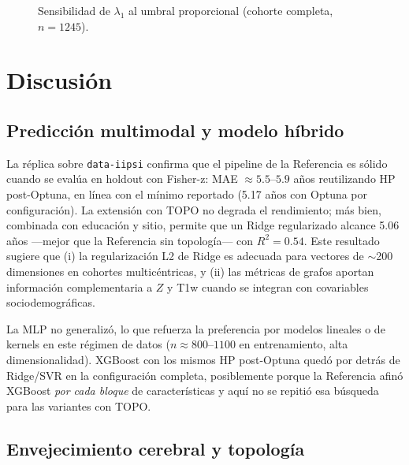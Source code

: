 \documentclass[12pt,a4paper]{article}
\begin{document}
\begin{figure}[H]
  \centering
  \caption{Sensibilidad de $\lambda_1$ al umbral proporcional (cohorte completa, $n = 1245$).}
  \label{fig:sensitivity}
\end{figure}

\section{Discusión}

\subsection{Predicción multimodal y modelo híbrido}

La réplica sobre \texttt{data-iipsi} confirma que el pipeline de la Referencia es sólido cuando
se evalúa en holdout con Fisher-z: MAE $\approx 5.5$--$5.9$ años reutilizando HP post-Optuna,
en línea con el mínimo reportado (5.17 años con Optuna por configuración). La extensión con TOPO no degrada el rendimiento;
más bien, combinada con educación y sitio, permite que un Ridge regularizado alcance
5.06 años ---mejor que la Referencia sin topología--- con $R^2 = 0.54$. Este resultado
sugiere que (i) la regularización L2 de Ridge es adecuada para vectores de $\sim$200 dimensiones
en cohortes multicéntricas, y (ii) las métricas de grafos aportan información complementaria a
$Z$ y T1w cuando se integran con covariables sociodemográficas.

La MLP no generalizó, lo que refuerza la preferencia por modelos lineales o de kernels en este
régimen de datos ($n \approx 800$--$1100$ en entrenamiento, alta dimensionalidad). XGBoost con
los mismos HP post-Optuna quedó por detrás de Ridge/SVR en la configuración completa, posiblemente
porque la Referencia afinó XGBoost \emph{por cada bloque} de características y aquí no se repitió
esa búsqueda para las variantes con TOPO.

\subsection{Envejecimiento cerebral y topología}
\end{document}
